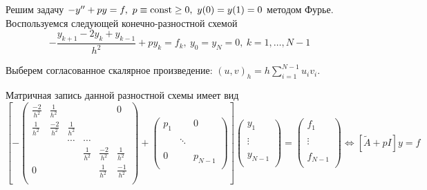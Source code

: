 \begin{example}
  Решим задачу $-y''+py=f,\ p\equiv\const\geq0,\ y(0)=y(1)=0$ методом Фурье.
  Воспользуемся следующей конечно-разностной схемой
  \[-\frac{y_{k+1}-2y_{k}+y_{k-1}}{h^2}+py_k=f_k,\ y_0=y_N=0,\ k=1,\ldots,N-1\]

  Выберем согласованное скалярное произведение: $(u,v)_h=h\sum_{i=1}^{N-1}u_iv_i$.

  Матричная запись данной разностной схемы имеет вид
  \[\left[-\left(\begin{array}{cccccc}
        \frac{-2}{h^2} & \frac{1}{h^2}  &               &               &                & 0              \\
        \frac{1}{h^2}  & \frac{-2}{h^2} & \frac{1}{h^2} &               &                &                \\
                       &                & \cdots        & \cdots        &                &                \\
                       &                &               & \frac{1}{h^2} & \frac{-2}{h^2} & \frac{1}{h^2}  \\
        0              &                &               &               & \frac{1}{h^2}  & \frac{-1}{h^2} \\
      \end{array}\right)
      +
      \left(\begin{array}{ccc}
        p_1 &        & 0       \\
            &        &         \\
            & \ddots &         \\
            &        &         \\
        0   &        & p_{N-1} \\
      \end{array}\right)\right]
    \left(\begin{array}{c}
        y_{1}   \\
        \\
        \vdots  \\
        \\
        y_{N-1} \\
      \end{array}\right)
    =\left(\begin{array}{c}
        f_{1}   \\
        \\
        \vdots  \\
        \\
        f_{N-1} \\
      \end{array}\right)
    \Leftrightarrow\left[\tilde{A}+pI\right]y=f\]


\end{example}
